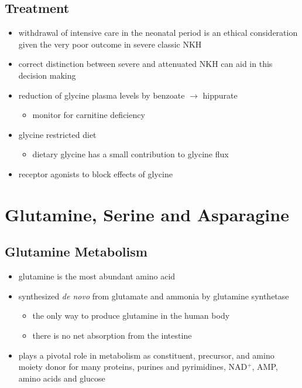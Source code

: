 \documentclass{scrartcl}
\begin{document}
\subsection{Treatment}
\label{sec:org52fa59f}
\begin{itemize}
\item withdrawal of intensive care in the neonatal period is an ethical
consideration given the very poor outcome in severe classic NKH
\item correct distinction between severe and attenuated NKH can aid in
this decision making
\item reduction of glycine plasma levels by benzoate \(\to\) hippurate
\begin{itemize}
\item monitor for carnitine deficiency
\end{itemize}
\item glycine restricted diet
\begin{itemize}
\item dietary glycine has a small contribution to glycine flux
\end{itemize}
\item receptor agonists to block effects of glycine
\end{itemize}

\section{Glutamine, Serine and Asparagine}
\label{sec:org38a241b}
\subsection{Glutamine Metabolism}
\label{sec:org3eb812f}
\begin{itemize}
\item glutamine is the most abundant amino acid
\item synthesized \emph{de novo} from glutamate and ammonia by glutamine synthetase
\begin{itemize}
\item the only way to produce glutamine in the human body
\item there is no net absorption from the intestine
\end{itemize}
\item plays a pivotal role in metabolism as constituent, precursor, and
amino moiety donor for many proteins, purines and pyrimidines,
NAD\(^{\text{+}}\), AMP, amino acids and glucose
\end{itemize}
\end{document}
